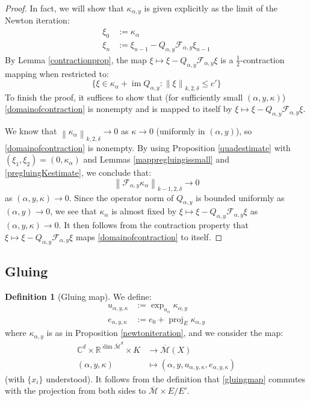 \documentclass[12pt]{article}
\theoremstyle{definition}
\newtheorem{definition}[theorem]{Definition}
\theoremstyle{remark}
\numberwithin{equation}{subsection}
\newcommand{\F}{\mathcal F}
\newcommand{\CC}{\mathbb C}
\newcommand{\RR}{\mathbb R}
\newcommand{\proj}{\operatorname{proj}}
\newcommand{\Mbar}{\overline{\mathcal M}}
\newcommand{\im}{\operatorname{im}}
\begin{document}
\begin{proof}
In fact, we will show that $\kappa_{\alpha,y}$ is given explicitly as the limit of the Newton iteration:
\begin{align}
\xi_0&:=\kappa_\alpha\\
\xi_n&:=\xi_{n-1}-Q_{\alpha,y}\F_{\alpha,y}\xi_{n-1}
\end{align}
By Lemma \ref{contractionprop}, the map $\xi\mapsto\xi-Q_{\alpha,y}\F_{\alpha,y}\xi$ is a $\frac 12$-contraction mapping when restricted to:
\begin{equation}\label{domainofcontraction}
\{\xi\in\kappa_\alpha+\im Q_{\alpha,y}:\left\|\xi\right\|_{k,2,\delta}\leq c'\}
\end{equation}
To finish the proof, it suffices to show that (for sufficiently small $(\alpha,y,\kappa)$) \eqref{domainofcontraction} is nonempty and is mapped to itself by $\xi\mapsto\xi-Q_{\alpha,y}\F_{\alpha,y}\xi$.

We know that $\left\|\kappa_\alpha\right\|_{k,2,\delta}\to 0$ as $\kappa\to 0$ (uniformly in $(\alpha,y)$), so \eqref{domainofcontraction} is nonempty.  By using Proposition \ref{quadestimate} with $(\xi_1,\xi_2)=(0,\kappa_\alpha)$ and Lemmas \ref{mappregluingissmall} and \ref{pregluingKestimate}, we conclude that:
\begin{equation}\label{kernelclosetoholomorphic}
\left\|\F_{\alpha,y}\kappa_\alpha\right\|_{k-1,2,\delta}\to 0
\end{equation}
as $(\alpha,y,\kappa)\to 0$.  Since the operator norm of $Q_{\alpha,y}$ is bounded uniformly as $(\alpha,y)\to 0$, we see that $\kappa_\alpha$ is almost fixed by $\xi\mapsto\xi-Q_{\alpha,y}\F_{\alpha,y}\xi$ as $(\alpha,y,\kappa)\to 0$.  It then follows from the contraction property that $\xi\mapsto\xi-Q_{\alpha,y}\F_{\alpha,y}\xi$ maps \eqref{domainofcontraction} to itself.
\end{proof}

\subsection{Gluing}

\begin{definition}[Gluing map]
We define:
\begin{align}
u_{\alpha,y,\kappa}&:=\exp_{u_\alpha}\kappa_{\alpha,y}\\
e_{\alpha,y,\kappa}&:=e_0+\proj_E\kappa_{\alpha,y}
\end{align}
where $\kappa_{\alpha,y}$ is as in Proposition \ref{newtoniteration}, and we consider the map:
\begin{align}\label{gluingmap}
\CC^d\times\RR^{\dim\Mbar^d}\times K&\to\Mbar(X)\\
(\alpha,y,\kappa)&\mapsto(\alpha,y,u_{\alpha,y,\kappa},e_{\alpha,y,\kappa})
\end{align}
(with $\{x_i\}$ understood).  It follows from the definition that \eqref{gluingmap} commutes with the projection from both sides to $\Mbar\times E/E'$.
\end{definition}
\end{document}
